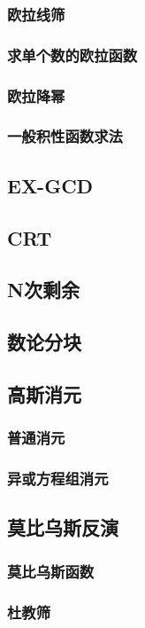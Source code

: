\documentclass[twocolumn,a4]{article}
\newcommand{\addcpp}[1]{}
\begin{document}
		\subsubsection{欧拉线筛}
		\subsubsection{求单个数的欧拉函数}
		\subsubsection{欧拉降幂}
		\subsubsection{一般积性函数求法}
	\subsection{EX-GCD}
	\subsection{CRT}
	\subsection{N次剩余}
	\subsection{数论分块}
	\subsection{高斯消元}
		\subsubsection{普通消元}
		\subsubsection{异或方程组消元}
	\subsection{莫比乌斯反演}
		\subsubsection{莫比乌斯函数}
		\subsubsection{杜教筛}
\end{document}
